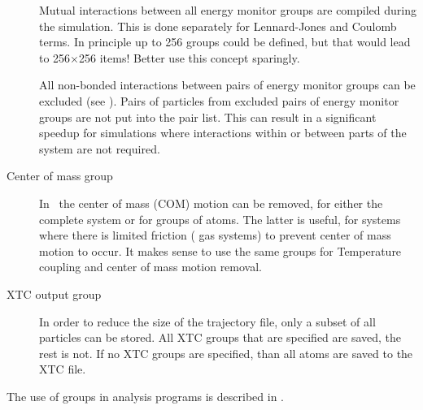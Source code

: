 \begin{description}
\item[]
Mutual interactions between all energy monitor groups are compiled
during the simulation. This is done separately for Lennard-Jones and
Coulomb terms.  In principle up to 256 groups could be defined, but
that would lead to 256$\times$256 items! Better use this concept
sparingly.

All non-bonded interactions between pairs of energy monitor groups can
be excluded (see ).
Pairs of particles from excluded pairs of energy monitor groups
are not put into the pair list.
This can result in a significant speedup
for simulations where interactions within or between parts of the system
are not required.

\item[Center of mass group]
In \gromacs\ the center of mass (COM) motion can be removed, for
either the complete system or for groups of atoms. The latter is
useful, {\eg} for systems where there is limited friction ({\eg} gas
systems) to prevent center of mass motion to occur. It makes sense to
use the same groups for Temperature coupling and center of mass motion
removal.

\item[XTC output group]
In order to reduce the size of the  trajectory file, only a subset
of all particles can be stored. All XTC groups that are specified
are saved, the rest is not. If no XTC groups are specified, than all
atoms are saved to the XTC file.

\end{description}
The use of groups in analysis programs is described in
.

